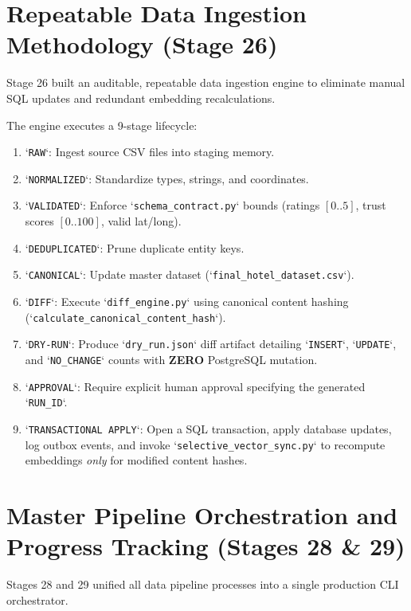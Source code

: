\section{Repeatable Data Ingestion Methodology (Stage 26)}
Stage 26 built an auditable, repeatable data ingestion engine to eliminate manual SQL updates and redundant embedding recalculations.

The engine executes a 9-stage lifecycle:
\begin{enumerate}
    \item `\texttt{RAW}`: Ingest source CSV files into staging memory.
    \item `\texttt{NORMALIZED}`: Standardize types, strings, and coordinates.
    \item `\texttt{VALIDATED}`: Enforce `\texttt{schema\_contract.py}` bounds (ratings $[0..5]$, trust scores $[0..100]$, valid lat/long).
    \item `\texttt{DEDUPLICATED}`: Prune duplicate entity keys.
    \item `\texttt{CANONICAL}`: Update master dataset (`\texttt{final\_hotel\_dataset.csv}`).
    \item `\texttt{DIFF}`: Execute `\texttt{diff\_engine.py}` using canonical content hashing (`\texttt{calculate\_canonical\_content\_hash}`).
    \item `\texttt{DRY-RUN}`: Produce `\texttt{dry\_run.json}` diff artifact detailing `\texttt{INSERT}`, `\texttt{UPDATE}`, and `\texttt{NO\_CHANGE}` counts with \textbf{ZERO} PostgreSQL mutation.
    \item `\texttt{APPROVAL}`: Require explicit human approval specifying the generated `\texttt{RUN\_ID}`.
    \item `\texttt{TRANSACTIONAL APPLY}`: Open a SQL transaction, apply database updates, log outbox events, and invoke `\texttt{selective\_vector\_sync.py}` to recompute embeddings \textit{only} for modified content hashes.
\end{enumerate}

\section{Master Pipeline Orchestration and Progress Tracking (Stages 28 \& 29)}
Stages 28 and 29 unified all data pipeline processes into a single production CLI orchestrator.

